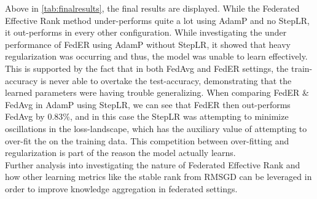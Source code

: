Above in \autoref{tab:finalresults}, the final results are displayed. While the Federated Effective Rank method under-performs quite a lot using AdamP and no StepLR, it out-performs in every other configuration. While investigating the under performance of FedER using AdamP without StepLR, it showed that heavy regularization was occurring and thus, the model was unable to learn effectively. This is supported by the fact that in both FedAvg and FedER settings, the train-accuracy is never able to overtake the test-accuracy, demonstrating that the learned parameters were having trouble generalizing. When comparing FedER \& FedAvg in AdamP using StepLR, we can see that FedER then out-performs FedAvg by 0.83\%, and in this case the StepLR was attempting to minimize oscillations in the loss-landscape, which has the auxiliary value of attempting to over-fit the on the training data. This competition between over-fitting and regularization is part of the reason the model actually learns.\\

Further analysis into investigating the nature of Federated Effective Rank and how other learning metrics like the stable rank from RMSGD \cite{hosseini2022explainable} can be leveraged in order to improve knowledge aggregation in federated settings.




